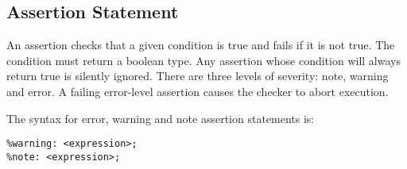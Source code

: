 
\subsection{Assertion Statement}
{
	An assertion checks that a given
	condition is true and fails if it is not true.
	The condition must return a boolean type.
	Any assertion whose condition will always return
	true is silently ignored.
	There are three levels of severity: note, warning and error.
	A failing error-level assertion causes the checker to abort execution.
	
	The syntax for error, warning and note assertion statements is:
	\begin{lstlisting}[numbers=none, texcl = true, language = MAIA]
%error: <expression>;
%warning: <expression>;
%note: <expression>;
	\end{lstlisting}
}
